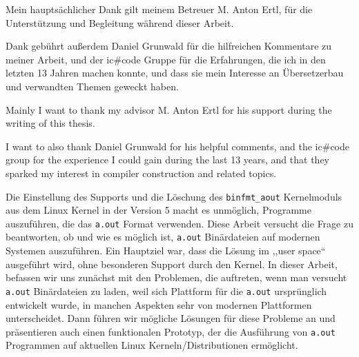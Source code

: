 \documentclass[draft,final]{vutinfth} %
\begin{document}
\frontmatter %

\addstatementpage

\begin{danksagung*}
Mein hauptsächlicher Dank gilt meinem Betreuer M. Anton Ertl, für die Unterstützung und Begleitung während dieser Arbeit.

Dank gebührt außerdem Daniel Grunwald für die hilfreichen Kommentare zu meiner Arbeit, und der ic\#code Gruppe für die Erfahrungen, die ich in den letzten 13 Jahren machen konnte, und dass sie mein Interesse an Übersetzerbau und verwandten Themen geweckt haben.
\end{danksagung*}

\begin{acknowledgements*}
Mainly I want to thank my advisor M. Anton Ertl for his support during the writing of this thesis.

I want to also thank Daniel Grunwald for his helpful comments, and the ic\#code group for the experience I could gain during the last 13 years, and that they sparked my interest in compiler construction and related topics.
\end{acknowledgements*}

\begin{kurzfassung}
Die Einstellung des Supports und die Löschung des \texttt{binfmt\_aout} Kernelmoduls aus dem Linux Kernel in der Version 5 macht es unmöglich, Programme auszuführen, die das \texttt{a.out} Format verwenden. Diese Arbeit versucht die Frage zu beantworten, ob und wie es möglich ist, \texttt{a.out} Binärdateien auf modernen Systemen auszuführen. Ein Hauptziel war, dass die Lösung im ,,user space`` ausgeführt wird, ohne besonderen Support durch den Kernel. In dieser Arbeit, befassen wir uns zunächst mit den Problemen, die auftreten, wenn man versucht \texttt{a.out} Binärdateien zu laden, weil sich Plattform für die \texttt{a.out} ursprünglich entwickelt wurde, in manchen Aspekten sehr von modernen Plattformen unterscheidet. Dann führen wir mögliche Lösungen für diese Probleme an und präsentieren auch einen funktionalen Prototyp, der die Ausführung von \texttt{a.out} Programmen auf aktuellen Linux Kerneln/Distributionen ermöglicht.
\end{kurzfassung}
\end{document}
